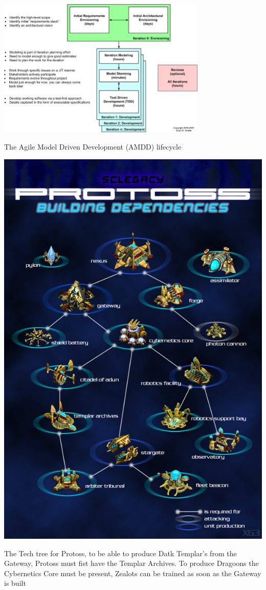 \documentclass[journal]{IEEEtran}
\begin{document}
\begin{table}
	\centering
	\includegraphics[width=0.75\textwidth]{AMDD}
	\centering\caption{The Agile Model Driven Development (AMDD) lifecycle \cite{AMDD}}
	\label{Fig10}
	\centering
	\includegraphics[width= 0.5 \textwidth]{ProtossTechTree}
	\centering\caption{The Tech tree for Protoss, to be able to produce Datk Templar's from the Gateway, Protoss must fist have the Templar Archives. To produce Dragoons the Cybernetics Core must be present, Zealots can be trained as soon as the Gateway is built \cite{Tech}}
	\label{Fig11}
\end{table}
\end{document}
